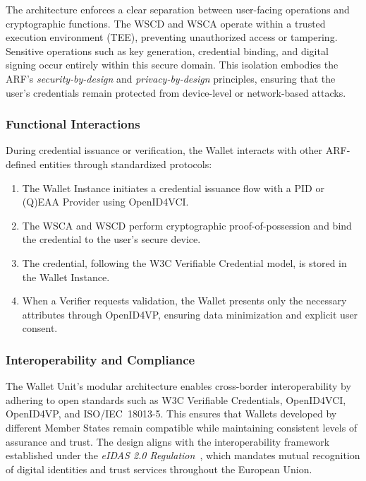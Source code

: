 \documentclass[sigconf,balance,nonacm,authordraft]{acmart}
\begin{document}
The architecture enforces a clear separation between user-facing operations and cryptographic functions. The WSCD and WSCA operate within a trusted execution environment (TEE), preventing unauthorized access or tampering. Sensitive operations such as key generation, credential binding, and digital signing occur entirely within this secure domain. This isolation embodies the ARF’s \textit{security-by-design} and \textit{privacy-by-design} principles, ensuring that the user’s credentials remain protected from device-level or network-based attacks.

\subsubsection*{Functional Interactions}

During credential issuance or verification, the Wallet interacts with other ARF-defined entities through standardized protocols:

\begin{enumerate}
    \item The Wallet Instance initiates a credential issuance flow with a PID or (Q)EAA Provider using OpenID4VCI.
    \item The WSCA and WSCD perform cryptographic proof-of-possession and bind the credential to the user’s secure device.
    \item The credential, following the W3C Verifiable Credential model, is stored in the Wallet Instance.
    \item When a Verifier requests validation, the Wallet presents only the necessary attributes through OpenID4VP, ensuring data minimization and explicit user consent.
\end{enumerate}

\subsubsection*{Interoperability and Compliance}

The Wallet Unit’s modular architecture enables cross-border interoperability by adhering to open standards such as W3C Verifiable Credentials, OpenID4VCI, OpenID4VP, and ISO/IEC~18013-5. This ensures that Wallets developed by different Member States remain compatible while maintaining consistent levels of assurance and trust. The design aligns with the interoperability framework established under the \textit{eIDAS 2.0 Regulation}~\cite{EU_eIDAS2024}, which mandates mutual recognition of digital identities and trust services throughout the European Union.
\end{document}
